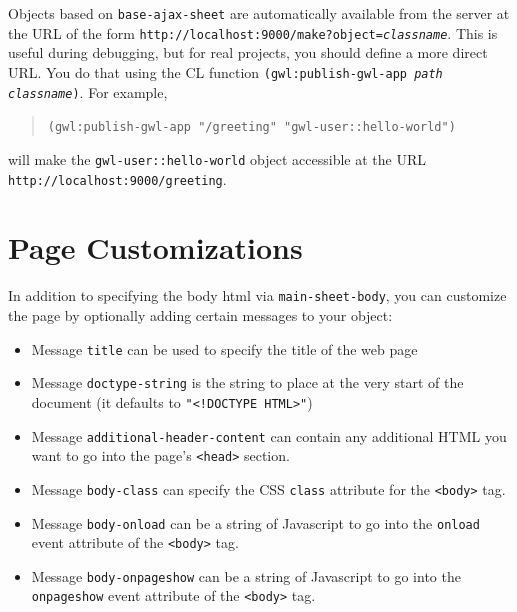 \documentclass [11pt]{book}
\begin{document}
\label{sec:pageurls}



Objects based on \texttt{base-ajax-sheet} are automatically available from the server at the
URL of the form \texttt{http://localhost:9000/make?object=\emph{classname}}.  This is useful during
debugging, but for real projects, you should define a more direct URL.  You do that using the
CL function \texttt{(gwl:publish-gwl-app \emph{path} \emph{classname})}.  For example,

\begin{quote}
\texttt{(gwl:publish-gwl-app "/greeting" "gwl-user::hello-world")}

\end{quote}
will make the \texttt{gwl-user::hello-world} object accessible at the URL \texttt{http://localhost:9000/greeting}.



\section{Page Customizations}

\label{sec:pagecustomizations}



In addition to specifying the body html via \texttt{main-sheet-body}, you can
customize the page by optionally adding certain messages to your object:

\begin{itemize}

\item Message \texttt{title} can be used to specify the title of the web page

\item Message \texttt{doctype-string} is the string to place at the very start
of the document (it defaults to \texttt{"<!DOCTYPE HTML>"})

\item Message \texttt{additional-header-content} can contain any additional
HTML you want to go into the page's \texttt{<head>} section.

\item Message \texttt{body-class} can specify the CSS \texttt{class} attribute for the \texttt{<body>} tag.

\item Message \texttt{body-onload} can be a string of Javascript to go
into the \texttt{onload} event attribute of the \texttt{<body>} tag.

\item Message \texttt{body-onpageshow} can be a string of Javascript to go
into the \texttt{onpageshow} event attribute of the \texttt{<body>} tag.

\end{itemize}
\end{document}
